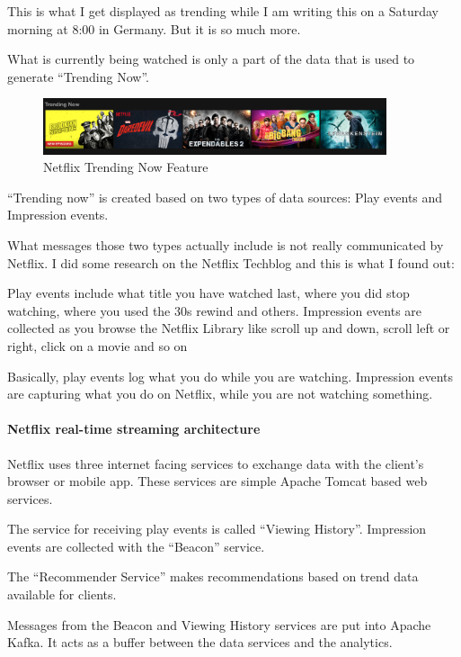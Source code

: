 \documentclass[12pt, numbers=noenddot]{scrreprt} %
\begin{document}
This is what I get displayed as trending while I am writing this on a Saturday morning at 8:00 in Germany. But it is so much more.

What is currently being watched is only a part of the data that is used to generate “Trending Now”.

\begin{figure}[htbp]
  \centering
     \includegraphics[width=0.9\textwidth]{images/Netflix-Trending-Now-Screenshot}
  \caption{Netflix Trending Now Feature}
  \label{fig:Bild1}
\end{figure}

“Trending now” is created based on two types of data sources: Play events and Impression events.

What messages those two types actually include is not really communicated by Netflix. I did some research on the Netflix Techblog and this is what I found out:

Play events include what title you have watched last, where you did stop watching, where you used the 30s rewind and others.
Impression events are collected as you browse the Netflix Library like scroll up and down, scroll left or right, click on a movie and so on

Basically, play events log what you do while you are watching. Impression events are capturing what you do on Netflix, while you are not watching something.

\paragraph{Netflix real-time streaming architecture}
Netflix uses three internet facing services to exchange data with the client’s browser or mobile app. These services are simple Apache Tomcat based web services.

The service for receiving play events is called “Viewing History”. Impression events are collected with the “Beacon” service.

The “Recommender Service” makes recommendations based on trend data available for clients.

Messages from the Beacon and Viewing History services are put into Apache Kafka.
It acts as a buffer between the data services and the analytics.
\end{document}
